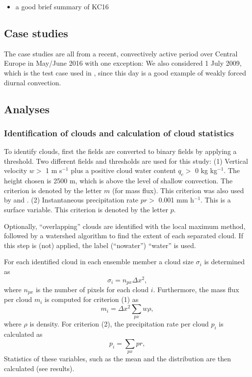 \documentclass[a4paper, 12pt]{article}
\begin{document}
\begin{itemize}
 \item a good brief summary of KC16
\end{itemize}

\subsection{Case studies}
The case studies are all from a recent, convectively active period over Central Europe in May/June 2016 with one exception: We also considered 1 July 2009, which is the test case used in \cite{Kober2016}, since this day is a good example of weakly forced diurnal convection.  

\subsection{Analyses}

\subsubsection{Identification of clouds and calculation of cloud statistics}
To identify clouds, first the fields are converted to binary fields by applying a threshold. Two different fields and thresholds are used for this study: (1) Vertical velocity $w >$ 1 m s$^{-1}$ plus a positive cloud water content $q_c >$ 0 kg kg$^{-1}$. The height chosen is 2500 m, which is above the level of shallow convection. The criterion is denoted by the letter $m$ (for mass flux). This criterion was also used by \cite{Cohen2006} and \cite{Davoudi2010}. (2) Instantaneous precipitation rate $pr >$ 0.001 mm h$^{-1}$. This is a surface variable. This criterion is denoted by the letter $p$.

Optionally, ``overlapping'' clouds are identified with the local maximum method, followed by a watershed algorithm to find the extent of each separated cloud. If this step is (not) applied, the label (``nowater'') ``water'' is used. 

For each identified cloud in each ensemble member a cloud size $\sigma_i$ is determined as
\begin{equation} \label{eq:cld_size}
 \sigma_i = n_{px} \Delta x^2,
\end{equation}
where $n_{px}$ is the number of pixels for each cloud $i$. Furthermore, the mass flux per cloud $m_i$ is computed for criterion (1) as
\begin{equation} \label{eq:mass_flux_per_cloud}
 m_i = \Delta x^2 \sum_{px} w \rho,
\end{equation}
where $\rho$ is density. For criterion (2), the precipitation rate per cloud $p_i$ is calculated as
\begin{equation} \label{eq:pr_per_cloud}
 p_i = \sum_{px} pr,
\end{equation}
Statistics of these variables, such as the mean and the distribution are then calculated (see results).
\end{document}
